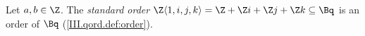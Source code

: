Let $a,b\in\Z$. The \emph{standard order} $\Z\langle1,i,j,k\rangle=\Z+\Z i+\Z j+\Z k\subseteq\Bq$ is an order of $\Bq$
(\cref{III.qord.def:order}).
